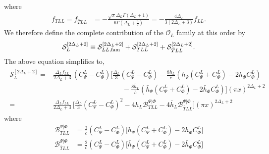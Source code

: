 \documentclass[11pt]{article}
\newcommand{\lb}{\left(}
\newcommand{\rb}{\right)}
\begin{document}
where
\begin{align}
    f_{TLL} = f_{\bar TLL}
    &=
    -\frac{\sqrt{\pi}\Delta_L\Gamma(\Delta_L+1)}
    {6\Gamma\lb\Delta_L+\frac52\rb}
    =
    -\frac{4\Delta_L}
    {3(2\Delta_L+3)}f_{LL}.
\end{align}
We therefore define the complete contribution of the
$\mathcal O_L$ family at this order by
\begin{align}
    \mathcal S_L^{[2\Delta_L+2]}
    \equiv
    \mathcal S_{LL,{\rm fam}}^{[2\Delta_L+2]}
    +
    \mathcal S_{TLL}^{[2\Delta_L+2]}
    +
    \mathcal S_{\bar TLL}^{[2\Delta_L+2]} .
\end{align}
The above equation simplifies to,
\begin{align}
\begin{aligned}
\mathcal S_L^{[2\Delta_L+2]}
={}&
\frac{\Delta_L f_{LL}}
{2\Delta_L+3}
\,(C^L_{\Psi}-C^L_{\Phi})
\Bigg[
\frac{\Delta_L}{3}(C^L_{\Psi}-C^L_{\Phi})
-\frac{8h_L}{c}
\left(
h_\Psi(C_\Psi^L+C_\Phi^L)
-2h_\Phi C_\Phi^L
\right)
\\
&\qquad \qquad\qquad\qquad\qquad
-\frac{8\bar h_L}{\bar c}
\left(
\bar h_\Psi(C_\Psi^L+C_\Phi^L)
-2\bar h_\Phi C_\Phi^L
\right)
\Bigg]
(\pi x)^{2\Delta_L+2} \\
=&{}\frac{\Delta_L f_{LL}}
{2\Delta_L+3}
\,
\Bigg[
\frac{\Delta_L}{3}(C^L_{\Psi}-C^L_{\Phi})^2
-4h_L\mathcal{B}_{TLL}^{\Psi|\Phi} - 4\bar h_L \mathcal{B}_{\bar T LL}^{\Psi|\Phi}
\Bigg]
(\pi x)^{2\Delta_L+2}
\end{aligned}
\end{align}
where
\begin{align}
    \mathcal{B}_{TLL}^{\Psi|\Phi} &= \frac{2}{c}\lb C^L_{\Psi} - C^L_{\Phi}\rb \big[  h_\Psi (C_\Psi^L + C_\Phi^L)  -2h_\Phi C_\Phi^L \big]\\
    \mathcal{B}_{\bar TLL}^{\Psi|\Phi} &= \frac{2}{\bar c}\lb C^L_{\Psi} - C^L_{\Phi}\rb \big[  \bar h_\Psi (C_\Psi^L + C_\Phi^L)  -2\bar h_\Phi C_\Phi^L \big]
\end{align}
\end{document}
